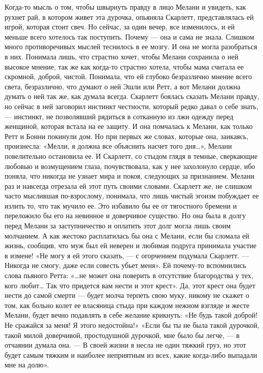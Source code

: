 Когда-то мысль о том, чтобы швырнуть правду в лицо Мелани и увидеть, как рухнет рай, в котором живет эта дурочка, опьяняла Скарлетт, представлялась ей игрой, которая стоит свеч. Но сейчас, за один вечер, все изменилось, и ей меньше всего хотелось так поступить. Почему — она и сама не знала. Слишком много противоречивых мыслей теснилось в ее мозгу. И она не могла разобраться в них. Понимала лишь, что страстно хочет, чтобы Мелани сохранила о ней высокое мнение, так же как когда-то страстно хотела, чтобы мама считала ее скромной, доброй, чистой. Понимала, что ей глубоко безразлично мнение всего света, безразлично, что думают о ней Эшли или Ретт, а вот Мелани должна думать о ней так же, как думала всегда.
Скарлетт боялась сказать Мелани правду, но сейчас в ней заговорил инстинкт честности, который редко давал о себе знать, — инстинкт, не позволявший рядиться в сотканную из лжи одежду перед женщиной, которая встала на ее защиту. И она помчалась к Мелани, как только Ретт и Бонни покинули дом.
Но при первых же словах, которые она, заикаясь, произнесла:
«Мелли, я должна все объяснить насчет того дня…», Мелани повелительно остановила ее. И Скарлетт, со стыдом глядя в темные, сверкающие любовью и возмущением глаза, почувствовала, как у нее захолонуло сердце, ибо поняла, что никогда не узнает мира и покоя, следующих за признанием. Мелани раз и навсегда отрезала ей этот путь своими словами. Скарлетт же, не слишком часто мыслившая по-взрослому, понимала, что лишь чистый эгоизм побуждает ее излить то, что так мучило ее. Это избавило бы ее от тягостного бремени и переложило бы его на невинное и доверчивое существо. Но она была в долгу перед Мелани за заступничество и оплатить этот долг могла лишь своим молчанием. А как жестоко расплатилась бы она с Мелани, если бы сломала ей жизнь, сообщив, что муж был ей неверен и любимая подруга принимала участие в измене!
«Не могу я ей этого сказать, — с огорчением подумала Скарлетт. — Никогда не смогу, даже если совесть убьет меня». Ей почему-то вспомнились слова пьяного Ретта: «…не может она поверить в отсутствие благородства у тех, кого любит… Так что придется вам нести и этот крест».
Да, этот крест она будет нести до самой смерти — будет молча терпеть свою муку, никому не скажет о том, как больно колет ее власяница стыда при каждом нежном взгляде и жесте Мелани, будет вечно подавлять в себе желание крикнуть: «Не будь такой доброй! Не сражайся за меня! Я этого недостойна!» «Если бы ты не была такой дурочкой, такой милой доверчивой, простодушной дурочкой, мне было бы легче, — в отчаянии думала она. — В своей жизни я несла не один тяжкий груз, но этот будет самым тяжким и наиболее неприятным из всех, какие когда-либо выпадали мне на долю».
